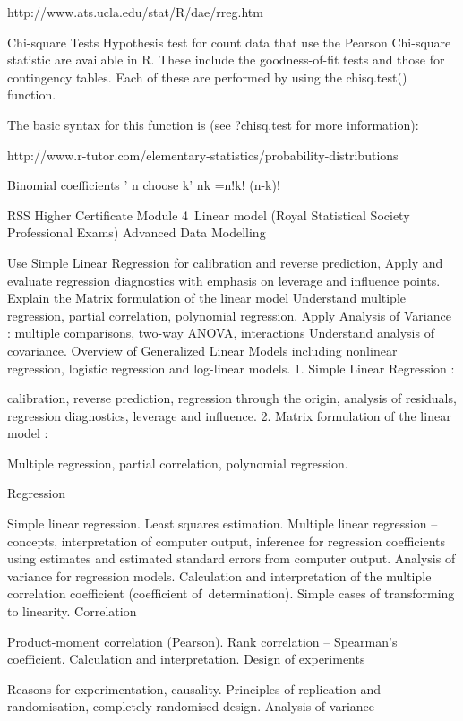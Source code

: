\documentclass[a4paper,12pt]{article}
\begin{document}
http://www.ats.ucla.edu/stat/R/dae/rreg.htm


 

Chi-square Tests
Hypothesis test for count data that use the Pearson Chi-square statistic are available in R.
These include the goodness-of-fit tests and those for contingency tables. Each of these are
performed by using the chisq.test() function. 

The basic syntax for this function is (see ?chisq.test for more information): 
 
http://www.r-tutor.com/elementary-statistics/probability-distributions




Binomial coefficients
' n choose k'
nk =n!k! (n-k)!

RSS Higher Certificate Module 4 Linear model
(Royal Statistical Society Professional Exams)
Advanced Data Modelling

Use Simple Linear Regression for calibration and reverse prediction,
Apply and evaluate regression diagnostics with emphasis on leverage and influence points.
Explain the Matrix formulation of the linear model
Understand multiple regression, partial correlation, polynomial regression.
Apply Analysis of Variance : multiple comparisons, two-way ANOVA, interactions
Understand analysis of covariance.
Overview of Generalized Linear Models including nonlinear regression, logistic regression and log-linear models.
1. Simple Linear Regression :

calibration, reverse prediction, regression through the origin, analysis of residuals, regression diagnostics, leverage and influence.
2. Matrix formulation of the linear model :

Multiple regression, partial correlation, polynomial regression.

Regression

Simple linear regression. Least squares estimation.
Multiple linear regression – concepts, interpretation of computer output, inference for regression coefficients using estimates and estimated standard errors from computer output.
Analysis of variance for regression models.
Calculation and interpretation of the multiple correlation coefficient (coefficient of determination).
Simple cases of transforming to linearity.
Correlation

Product-moment correlation (Pearson).
Rank correlation – Spearman’s coefficient.
Calculation and interpretation.
Design of experiments

Reasons for experimentation, causality.
Principles of replication and randomisation, completely randomised design.
Analysis of variance
\end{document}
